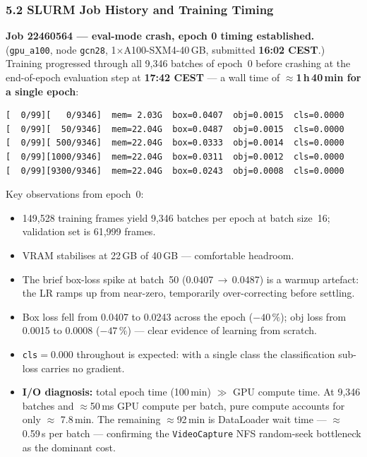 \subsubsection*{5.2 SLURM Job History and Training Timing}

\textbf{Job 22460564 — eval-mode crash, epoch 0 timing established.}
(\texttt{gpu\_a100}, node \texttt{gcn28}, 1$\times$A100-SXM4-40\,GB,
submitted \textbf{16:02 CEST}.) Training progressed through all 9,346
batches of epoch~0 before crashing at the end-of-epoch evaluation step
at \textbf{17:42 CEST} — a wall time of $\approx$\textbf{1\,h\,40\,min
for a single epoch}:

\begin{verbatim}
[  0/99][   0/9346]  mem= 2.03G  box=0.0407  obj=0.0015  cls=0.0000
[  0/99][  50/9346]  mem=22.04G  box=0.0487  obj=0.0015  cls=0.0000
[  0/99][ 500/9346]  mem=22.04G  box=0.0333  obj=0.0014  cls=0.0000
[  0/99][1000/9346]  mem=22.04G  box=0.0311  obj=0.0012  cls=0.0000
[  0/99][9300/9346]  mem=22.04G  box=0.0243  obj=0.0008  cls=0.0000
\end{verbatim}

\noindent Key observations from epoch~0:
\begin{itemize}
    \item 149,528 training frames yield 9,346 batches per epoch at
          batch size~16; validation set is 61,999 frames.
    \item VRAM stabilises at 22\,GB of 40\,GB — comfortable headroom.
    \item The brief box-loss spike at batch~50 (0.0407\,$\to$\,0.0487)
          is a warmup artefact: the LR ramps up from near-zero,
          temporarily over-correcting before settling.
    \item Box loss fell from 0.0407 to 0.0243 across the epoch
          ($-40\,\%$); obj loss from 0.0015 to 0.0008 ($-47\,\%$) —
          clear evidence of learning from scratch.
    \item \texttt{cls}$=0.000$ throughout is expected: with a single
          class the classification sub-loss carries no gradient.
    \item \textbf{I/O diagnosis:} total epoch time (100\,min) $\gg$
          GPU compute time. At 9,346 batches and $\approx$50\,ms GPU
          compute per batch, pure compute accounts for only $\approx$
          7.8\,min. The remaining $\approx$92\,min is DataLoader wait
          time — $\approx$0.59\,s per batch — confirming the
          \texttt{VideoCapture} NFS random-seek bottleneck as the
          dominant cost.
\end{itemize}

